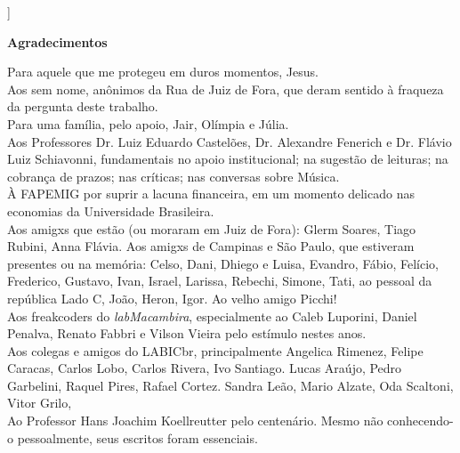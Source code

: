]%
\newpage
\begin{flushright}
\huge{\textbf{Agradecimentos}}

\small{Para aquele que me protegeu em duros momentos, Jesus.  
\ \\
Aos sem nome, anônimos da Rua de Juiz de Fora, que deram sentido à fraqueza da pergunta deste trabalho.
\ \\
Para uma família, pelo apoio, Jair, Olímpia e Júlia. 
\ \\
Aos Professores Dr. Luiz Eduardo Castelões, Dr. Alexandre Fenerich e Dr. Flávio Luiz Schiavonni, fundamentais no apoio institucional; na sugestão de leituras; na cobrança de prazos; nas críticas; nas conversas sobre Música. 
\ \\
À FAPEMIG por suprir a lacuna financeira, em um momento delicado nas economias da Universidade Brasileira.
\ \\
Aos amigxs que estão (ou moraram em Juiz de Fora): Glerm Soares, Tiago Rubini, Anna Flávia. Aos amigxs de Campinas e São Paulo, que estiveram presentes ou na memória: Celso, Dani, Dhiego e Luisa, Evandro, Fábio, Felício, Frederico, Gustavo, Ivan, Israel, Larissa, Rebechi, Simone, Tati,  ao pessoal da república Lado C, João, Heron, Igor. Ao velho amigo Picchi!
\ \\
Aos freakcoders do \emph{labMacambira}, especialmente ao Caleb Luporini, Daniel Penalva, Renato Fabbri e Vilson Vieira pelo estímulo nestes anos. 
\ \\
Aos colegas e amigos do LABICbr, principalmente Angelica Rimenez, Felipe Caracas, Carlos Lobo, Carlos Rivera, 
Ivo Santiago. Lucas Araújo, Pedro Garbelini, Raquel Pires, Rafael Cortez. Sandra Leão, Mario Alzate,  Oda Scaltoni, Vitor Grilo, 
\ \\
Ao Professor Hans Joachim Koellreutter pelo centenário. Mesmo não conhecendo-o pessoalmente, seus escritos foram essenciais.}
\end{flushright}

\newpage